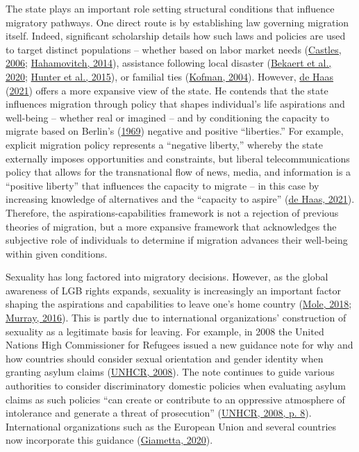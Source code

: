 \documentclass[
  12pt,
]{article}
\begin{document}
The state plays an important role setting structural conditions that influence migratory pathways. One direct route is by establishing law governing migration itself. Indeed, significant scholarship details how such laws and policies are used to target distinct populations -- whether based on labor market needs (\protect\hyperlink{ref-castles_2006}{Castles, 2006}; \protect\hyperlink{ref-hahamovitch_2014}{Hahamovitch, 2014}), assistance following local disaster (\protect\hyperlink{ref-bekaert_2020}{Bekaert et al., 2020}; \protect\hyperlink{ref-hunter_2015}{Hunter et al., 2015}), or familial ties (\protect\hyperlink{ref-kofman_2004_family}{Kofman, 2004}). However, \protect\hyperlink{ref-dehaas_2021}{de Haas} (\protect\hyperlink{ref-dehaas_2021}{2021}) offers a more expansive view of the state. He contends that the state influences migration through policy that shapes individual's life aspirations and well-being -- whether real or imagined -- and by conditioning the capacity to migrate based on Berlin's (\protect\hyperlink{ref-berlin_1969_four}{1969}) negative and positive ``liberties.'' For example, explicit migration policy represents a ``negative liberty,'' whereby the state externally imposes opportunities and constraints, but liberal telecommunications policy that allows for the transnational flow of news, media, and information is a ``positive liberty'' that influences the capacity to migrate -- in this case by increasing knowledge of alternatives and the ``capacity to aspire'' (\protect\hyperlink{ref-dehaas_2021}{de Haas, 2021}). Therefore, the aspirations-capabilities framework is not a rejection of previous theories of migration, but a more expansive framework that acknowledges the subjective role of individuals to determine if migration advances their well-being within given conditions.

Sexuality has long factored into migratory decisions. However, as the global awareness of LGB rights expands, sexuality is increasingly an important factor shaping the aspirations and capabilities to leave one's home country (\protect\hyperlink{ref-mole_2018a}{Mole, 2018}; \protect\hyperlink{ref-murray_2016}{Murray, 2016}). This is partly due to international organizations' construction of sexuality as a legitimate basis for leaving. For example, in 2008 the United Nations High Commissioner for Refugees issued a new guidance note for why and how countries should consider sexual orientation and gender identity when granting asylum claims (\protect\hyperlink{ref-unhcr_2008}{UNHCR, 2008}). The note continues to guide various authorities to consider discriminatory domestic policies when evaluating asylum claims as such policies ``can create or contribute to an oppressive atmosphere of intolerance and generate a threat of prosecution'' (\protect\hyperlink{ref-unhcr_2008}{UNHCR, 2008, p. 8}). International organizations such as the European Union and several countries now incorporate this guidance (\protect\hyperlink{ref-giametta_2020}{Giametta, 2020}).
\end{document}
